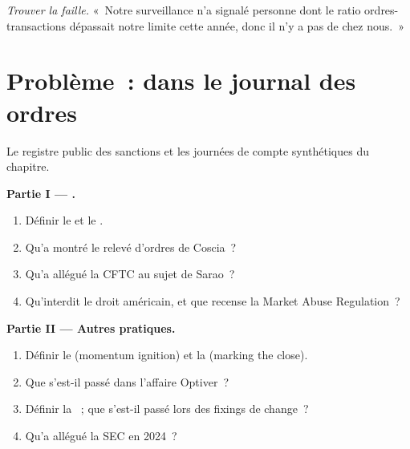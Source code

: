 \begin{exercise}[$\star\star\star$]\label{exo:s2:manipulative-strategies-and-how-they-are-caught:8}
\emph{Trouver la faille.} «~Notre surveillance n'a signalé personne dont le ratio ordres-transactions dépassait notre limite cette année, donc il n'y a pas de  chez nous.~»
\end{exercise}

\section{Problème~: dans le journal des ordres}

\begin{problem}\label{pb:s2:manipulative-strategies-and-how-they-are-caught:1}
Le registre public des sanctions et les journées de compte synthétiques du chapitre.

\medskip\noindent\textbf{Partie I --- .}
\begin{enumerate}
\item Définir le  et le .
\item Qu'a montré le relevé d'ordres de Coscia~?
\item Qu'a allégué la CFTC au sujet de Sarao~?
\item Qu'interdit le droit américain, et que recense la Market Abuse Regulation~?
\end{enumerate}

\medskip\noindent\textbf{Partie II --- Autres pratiques.}
\begin{enumerate}[resume]
\item Définir le  (momentum ignition) et la  (marking the close).
\item Que s'est-il passé dans l'affaire Optiver~?
\item Définir la ~; que s'est-il passé lors des fixings de change~?
\item Qu'a allégué la SEC en 2024~?
\end{enumerate}


\end{problem}
